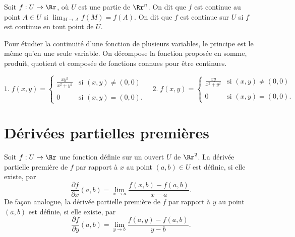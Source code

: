 \documentclass[class=report,crop=false]{standalone}
\begin{document}
\vskip6mm

\begin{definition} Soit $f:U\to \Rr$, o\`u $U$ est une partie de $\Rr^n$. On dit que $f$ est continue au point $A\in U$ si $\displaystyle \lim _{M\to A}f(M)=f(A)$. On dit que $f$ est continue sur $U$ si $f$ est continue en tout point de $U$.
\end{definition}

\vskip4mm

Pour étudier la continuité d'une fonction de plusieurs variables, le principe est le m\^eme qu'en une seule variable. On décompose la fonction proposée en somme, produit, quotient et composée de fonctions connues pour \^etre continues.

\vskip6mm

$$1.\; f(x,y)=\left\{\begin{array}{cl}\displaystyle \frac{xy^2}{x^2+y^2}&\mbox{si }(x,y)\neq (0,0)\\ \\ 0&\mbox{si }(x,y)=(0,0).\end{array}\right. \quad 2.\; f(x,y)=\left\{\begin{array}{cl}\displaystyle \frac{xy}{x^2+y^2}&\mbox{si }(x,y)\neq (0,0)\\ \\ 0&\mbox{si }(x,y)=(0,0).\end{array}\right.$$

\vskip8mm

\section{Dérivées partielles premières}

\vskip4mm

\begin{definition}Soit $f:U\to \Rr$ une fonction définie sur un ouvert $U$ de $\Rr^2$. La dérivée partielle première de $f$ par rapport à $x$ au point $(a,b)\in U$ est définie, si elle existe, par
$$\frac{\partial f}{\partial x}(a,b)=\lim _{x\to a}\frac{f(x,b)-f(a,b)}{x-a}.$$
De fa\c con analogue, la dérivée partielle première de $f$ par rapport à $y$ au point $(a,b)$ est définie, si elle existe, par
$$\frac{\partial f}{\partial y}(a,b)=\lim _{y\to b}\frac{f(a,y)-f(a,b)}{y-b}.$$
\end{definition}

\vskip4mm
\end{document}
